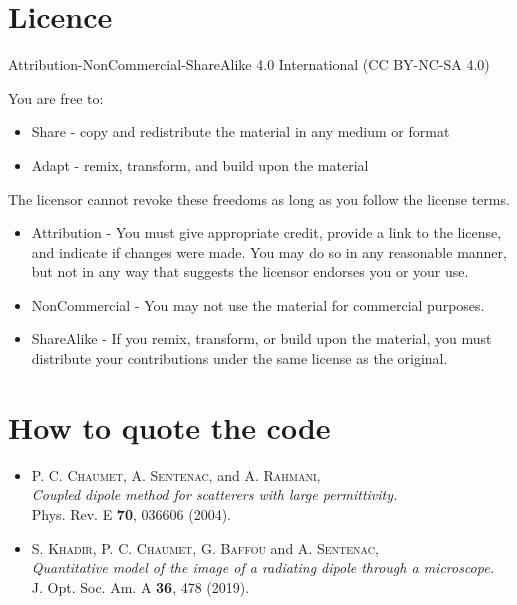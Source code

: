 \section{Licence}


Attribution-NonCommercial-ShareAlike 4.0 International (CC BY-NC-SA 4.0)

You are free to:

\begin{itemize}
\item Share - copy and redistribute the material in any medium or
  format
\item Adapt - remix, transform, and build upon the material
\end{itemize}

The licensor cannot revoke these freedoms as long as you follow the
license terms.
\begin{itemize}
\item Attribution - You must give appropriate credit, provide a link
  to the license, and indicate if changes were made. You may do so in
  any reasonable manner, but not in any way that suggests the licensor
  endorses you or your use.
\item NonCommercial - You may not use the material for commercial
  purposes.
\item ShareAlike - If you remix, transform, or build upon the
  material, you must distribute your contributions under the same
  license as the original.
\end{itemize}


\section{How to quote the code}

\begin{itemize}

\item P. C. {\textsc{Chaumet}}, A. {\textsc{Sentenac}}, and
  A. {\textsc{Rahmani}}, \\{\it Coupled dipole method for scatterers
    with large permittivity.}\\ Phys. Rev. E {\bf 70}, 036606 (2004).

\item S. {\textsc{Khadir}}, P. C. {\textsc{Chaumet}},
  G. {\textsc{Baffou}} and A. {\textsc{Sentenac}}, \\{\it Quantitative
    model of the image of a radiating dipole through a
    microscope.}\\ J. Opt. Soc. Am. A {\bf 36}, 478 (2019).

\end{itemize}
